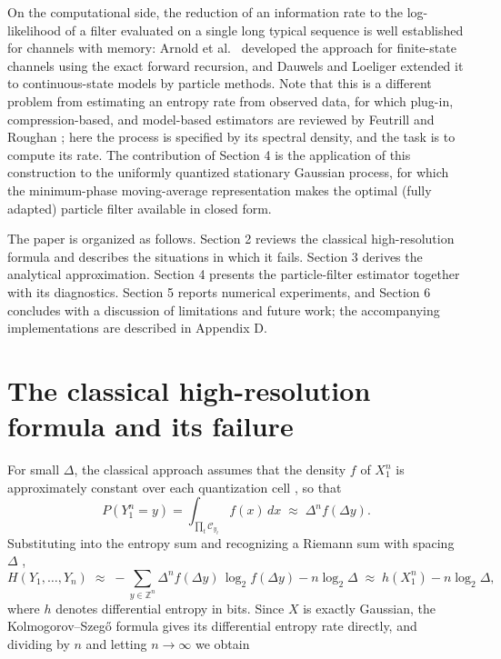 \documentclass[11pt]{article}
\begin{document}
On the computational side, the reduction of an information rate to the log-likelihood of a filter evaluated on a single long typical sequence is well established for channels with memory: Arnold et al.\ \cite{ArnoldEtAl2006} developed the approach for finite-state channels using the exact forward recursion, and Dauwels and Loeliger \cite{DauwelsLoeliger2008} extended it to continuous-state models by particle methods. Note that this is a different problem from estimating an entropy rate from observed data, for which plug-in, compression-based, and model-based estimators are reviewed by Feutrill and Roughan \cite{FeutrillRoughan2021}; here the process is specified by its spectral density, and the task is to compute its rate. The contribution of Section 4 is the application of this construction to the uniformly quantized stationary Gaussian process, for which the minimum-phase moving-average representation makes the optimal (fully adapted) particle filter available in closed form.

The paper is organized as follows. Section 2 reviews the classical high-resolution formula and describes the situations in which it fails. Section 3 derives the analytical approximation. Section 4 presents the particle-filter estimator together with its diagnostics. Section 5 reports numerical experiments, and Section 6 concludes with a discussion of limitations and future work; the accompanying implementations are described in Appendix D.

\section{The classical high-resolution formula and its failure}\label{the-classical-high-resolution-formula-and-its-failure}

For small \(\Delta\), the classical approach assumes that the density \(f\) of \(X_1^n\) is approximately constant over each quantization cell \cite{GrayNeuhoff1998}, so that
\[P(Y_1^n = y) = \int_{\prod_t \mathcal C_{y_t}} f(x)\,dx \;\approx\; \Delta^n f(\Delta y).\]
Substituting into the entropy sum and recognizing a Riemann sum with spacing \(\Delta\) \cite[Ch.~8]{CoverThomas2006},
\[H(Y_1,\dots,Y_n) \;\approx\; -\sum_{y\in\mathbb Z^n}\Delta^n f(\Delta y)\,\log_2 f(\Delta y) - n\log_2\Delta \;\approx\; h(X_1^n) - n\log_2\Delta,\]
where \(h\) denotes differential entropy in bits. Since \(X\) is exactly Gaussian, the Kolmogorov--Szegő formula gives its differential entropy rate directly, and dividing by \(n\) and letting \(n\to\infty\) we obtain
\end{document}

